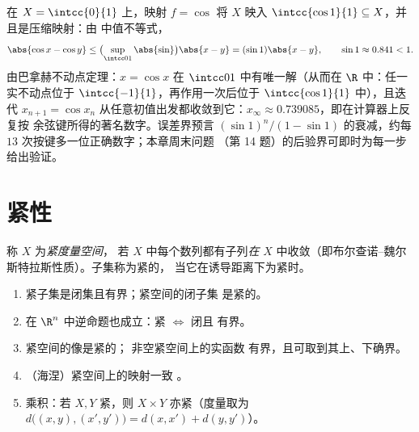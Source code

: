 \begin{example}[数值不动点：$x = \cos x$]\label{ex:b2:metric:cosfix}
在 $X = \intcc{0}{1}$ 上，映射 $f = \cos$ 将 $X$
映入 $\intcc{\cos 1}{1} \subseteq X$，并且是压缩映射：由
中值不等式，
\[
\abs{\cos x - \cos y} \leq \bigl(\sup_{\intcc01}\abs{\sin}\bigr)
\abs{x - y} = (\sin 1)\abs{x - y},
\qquad \sin 1 \approx 0.841 < 1 .
\]
由巴拿赫不动点定理：$x = \cos x$ 在 $\intcc01$ 中有唯一解（从而在
$\R$ 中：任一实不动点位于 $\intcc{-1}{1}$，再作用一次后位于
$\intcc{\cos 1}{1}$ 中），且迭代
$x_{n+1} = \cos x_n$ 从任意初值出发都收敛到它：$x_\infty
\approx 0.739085$，即在计算器上反复按
余弦键所得的著名数字。误差界预言
$(\sin1)^n/(1 - \sin1)$ 的衰减，约每
$13$ 次按键多一位正确数字；本章周末问题
（第 14 题）的后验界可即时为每一步给出验证。
\end{example}

\section{紧性}

\begin{definition}\label{def:b2:metric:compact}
称 $X$ 为\emph{紧度量空间}，
若 $X$ 中每个数列都有子列\emph{在}
$X$ 中收敛（即布尔查诺–魏尔斯特拉斯性质）。子集称为紧的，
当它在诱导距离下为紧时。
\end{definition}

\begin{theorem}[基本性质]\label{thm:b2:metric:compactprops}
\begin{enumerate}
  \item 紧子集是闭集且有界；紧空间的闭子集
        是紧的。
  \item 在 $\R^n$ 中逆命题也成立：紧 $\iff$ 闭且
        有界。
  \item 紧空间的像是紧的；
        非空紧空间上的实函数
        有界，且可取到其上、下确界。
  \item （海涅）紧空间上的映射一致
        。
  \item 乘积：若 $X, Y$ 紧，则 $X \times Y$ 亦紧（度量取为
        $d\bigl((x,y),(x',y')\bigr) = d(x,x') + d(y,y')$）。
\end{enumerate}
\end{theorem}

